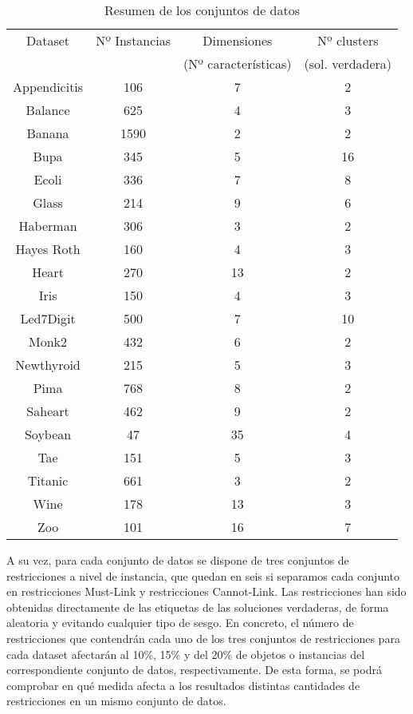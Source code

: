 \begin{table}[h]
\centering
\small
\caption{Resumen de los conjuntos de datos}
\begin{tabular}{|c|c|c|c|}
\hline
Dataset & Nº Instancias & Dimensiones & Nº clusters  \\
 & &(Nº características)&(sol. verdadera)\\
\hline
Appendicitis & 106 & 7 & 2 \\ 
Balance & 625 & 4 & 3\\ 
Banana\footnotemark & 1590 & 2 & 2\\ 
Bupa & 345 & 5 & 16 \\ 
Ecoli & 336 & 7 & 8 \\ 
Glass & 214 & 9 & 6 \\ 
Haberman & 306 & 3 & 2 \\ 
Hayes Roth & 160 & 4 & 3 \\ 
Heart & 270 & 13 & 2\\ 
Iris & 150 & 4 & 3 \\ 
Led7Digit & 500 & 7 & 10\\ 
Monk2 & 432 & 6 & 2 \\ 
Newthyroid & 215 & 5 & 3 \\ 
Pima & 768 & 8 & 2 \\ 
Saheart & 462 & 9 & 2 \\ 
Soybean & 47 & 35 & 4\\ 
Tae & 151 & 5 & 3 \\ 
Titanic\footnotemark[\value{footnote}] & 661 & 3 & 2\\ 
Wine & 178 & 13 & 3 \\ 
Zoo & 101 & 16 & 7 \\

\hline
\end{tabular}
\label{tab:datasets}

\end{table}




A su vez, para cada conjunto de datos se dispone de tres conjuntos de restricciones a nivel de instancia, que quedan en seis si separamos cada conjunto en restricciones Must-Link y restricciones Cannot-Link. Las restricciones han sido obtenidas directamente de las etiquetas de las soluciones verdaderas, de forma aleatoria y evitando cualquier tipo de sesgo. En concreto, el número de restricciones que contendrán cada uno de los tres conjuntos de restricciones para cada dataset afectarán al 10\%, 15\% y del 20\% de objetos o instancias del correspondiente conjunto de datos, respectivamente. De esta forma, se podrá comprobar en qué medida afecta a los resultados distintas cantidades de restricciones en un mismo conjunto de datos.


